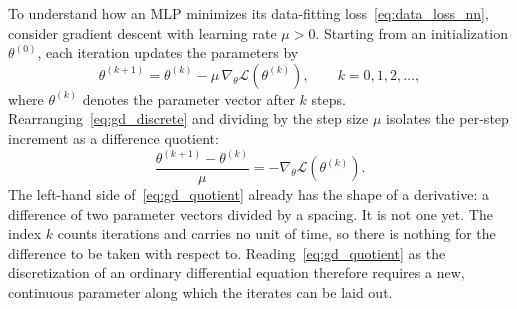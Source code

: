 To understand how an MLP minimizes its data-fitting loss~\eqref{eq:data_loss_nn}, consider gradient descent with learning rate $\mu > 0$. Starting from an initialization $\theta^{(0)}$, each iteration updates the parameters by
\begin{equation}\label{eq:gd_discrete}
    \theta^{(k+1)} = \theta^{(k)} - \mu\,\nabla_\theta\mathcal{L}(\theta^{(k)}), \qquad k = 0, 1, 2, \ldots,
\end{equation}
where $\theta^{(k)}$ denotes the parameter vector after $k$ steps. Rearranging~\eqref{eq:gd_discrete} and dividing by the step size $\mu$ isolates the per-step increment as a difference quotient:
\begin{equation}\label{eq:gd_quotient}
    \frac{\theta^{(k+1)} - \theta^{(k)}}{\mu} = -\nabla_\theta\mathcal{L}(\theta^{(k)}).
\end{equation}
The left-hand side of~\eqref{eq:gd_quotient} already has the shape of a derivative: a difference of two parameter vectors divided by a spacing. It is not one yet. The index $k$ counts iterations and carries no unit of time, so there is nothing for the difference to be taken with respect to. Reading~\eqref{eq:gd_quotient} as the discretization of an ordinary differential equation therefore requires a new, continuous parameter along which the iterates can be laid out.

